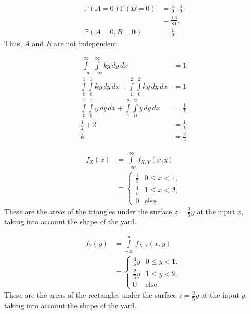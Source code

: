 \documentclass[12pt]{article}
\begin{document}
\medskip
{}
\begin{align*}
    \mathbb P(A = 0) \mathbb P(B = 0) &= \frac49 \cdot \frac49 \\
                                      &= \frac{16}{81}. \\
    \mathbb P(A = 0, B = 0) &= \frac19.
\end{align*} Thus, $A$ and $B$ are not independent.

\newpage
{}

\medskip
{}
\begin{align*}
    \int\limits_{-\infty}^\infty \int\limits_{-\infty}^\infty ky\,dy\,dx &= 1 \\
    \int\limits_0^1\int\limits_0^1ky\,dy\,dx + \int\limits_1^2\int\limits_0^2 ky\,dy\,dx &= 1 \\
    \int\limits_0^1\int\limits_0^1y\,dy\,dx + \int\limits_1^2\int\limits_0^2 y\,dy\,dx &= \frac1k \\
    \frac12 + 2 &= \frac1k \\
    k &= \frac25
\end{align*}

\medskip
{}
\begin{align*}
    f_X(x) &= \int\limits_{-\infty}^\infty f_{X,Y}(x,y) \\
           &= \begin{cases} \frac15 & 0 \leq x < 1, \\
                            \frac45 & 1 \leq x < 2, \\
                            0 & \text{else.} \end{cases}
\end{align*} These are the areas of the triangles under the surface $z=\frac25y$ at the input $x$, taking into account the shape of the yard.

\begin{align*}
    f_Y(y) &= \int\limits_{-\infty}^\infty f_{X,Y}(x,y) \\
           &= \begin{cases} \frac45y & 0 \leq y < 1, \\
                            \frac25y & 1 \leq y < 2, \\
                            0 & \text{else.} \end{cases}
\end{align*} These are the areas of the rectangles under the surface $z=\frac25y$ at the input $y$, taking into account the shape of the yard.
\end{document}
